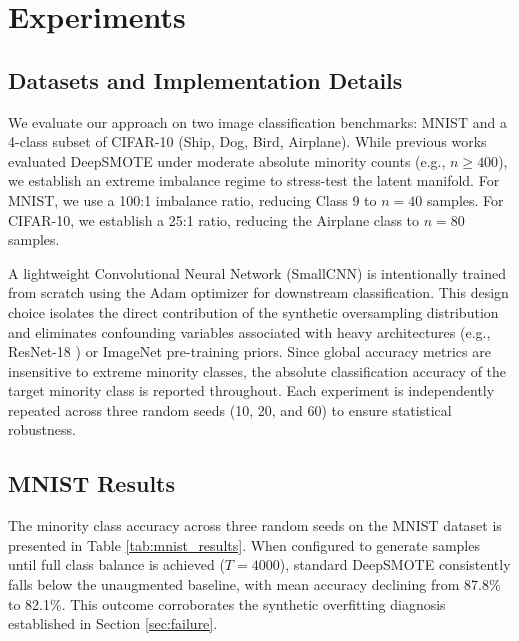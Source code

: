 \documentclass[conference]{IEEEtran}
\begin{document}
\section{Experiments}
\label{sec:experiments}

\subsection{Datasets and Implementation Details}
\label{subsec:impl}
We evaluate our approach on two image classification benchmarks: MNIST \cite{lecun1998gradient} and a 4-class subset of CIFAR-10 \cite{krizhevsky2009learning} (Ship, Dog, Bird, Airplane). While previous works evaluated DeepSMOTE under moderate absolute minority counts (e.g., $n \ge 400$), we establish an extreme imbalance regime to stress-test the latent manifold. For MNIST, we use a 100:1 imbalance ratio, reducing Class 9 to $n=40$ samples. For CIFAR-10, we establish a 25:1 ratio, reducing the Airplane class to $n=80$ samples. 

A lightweight Convolutional Neural Network (SmallCNN) \cite{lecun1989backpropagation} is intentionally trained from scratch using the Adam optimizer \cite{kingma2014adam} for downstream classification. This design choice isolates the direct contribution of the synthetic oversampling distribution and eliminates confounding variables associated with heavy architectures (e.g., ResNet-18 \cite{he2016deep}) or ImageNet pre-training priors. Since global accuracy metrics are insensitive to extreme minority classes, the absolute classification accuracy of the target minority class is reported throughout. Each experiment is independently repeated across three random seeds (10, 20, and 60) to ensure statistical robustness.

\subsection{MNIST Results}
\label{subsec:mnist}
The minority class accuracy across three random seeds on the MNIST dataset is presented in Table \ref{tab:mnist_results}. When configured to generate samples until full class balance is achieved ($T=4000$), standard DeepSMOTE consistently falls below the unaugmented baseline, with mean accuracy declining from 87.8\% to 82.1\%. This outcome corroborates the synthetic overfitting diagnosis established in Section \ref{sec:failure}.
\end{document}
